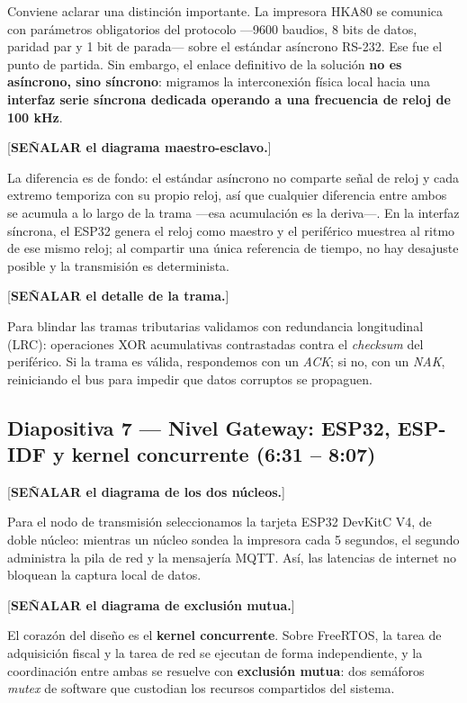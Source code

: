 \documentclass[11pt, a4paper]{article}
\begin{document}
Conviene aclarar una distinción importante. La impresora HKA80 se comunica con parámetros obligatorios del protocolo —9600 baudios, 8 bits de datos, paridad par y 1 bit de parada— sobre el estándar asíncrono RS-232. Ese fue el punto de partida. Sin embargo, el enlace definitivo de la solución \textbf{no es asíncrono, sino síncrono}: migramos la interconexión física local hacia una \textbf{interfaz serie síncrona dedicada operando a una frecuencia de reloj de 100 kHz}.

[\textbf{SEÑALAR el diagrama maestro-esclavo.}]

La diferencia es de fondo: el estándar asíncrono no comparte señal de reloj y cada extremo temporiza con su propio reloj, así que cualquier diferencia entre ambos se acumula a lo largo de la trama —esa acumulación es la deriva—. En la interfaz síncrona, el ESP32 genera el reloj como maestro y el periférico muestrea al ritmo de ese mismo reloj; al compartir una única referencia de tiempo, no hay desajuste posible y la transmisión es determinista.

[\textbf{SEÑALAR el detalle de la trama.}]

Para blindar las tramas tributarias validamos con redundancia longitudinal (LRC): operaciones XOR acumulativas contrastadas contra el \textit{checksum} del periférico. Si la trama es válida, respondemos con un \textit{ACK}; si no, con un \textit{NAK}, reiniciando el bus para impedir que datos corruptos se propaguen.

\subsection*{Diapositiva 7 — Nivel Gateway: ESP32, ESP-IDF y kernel concurrente (6:31 – 8:07)}

[\textbf{SEÑALAR el diagrama de los dos núcleos.}]

Para el nodo de transmisión seleccionamos la tarjeta ESP32 DevKitC V4, de doble núcleo: mientras un núcleo sondea la impresora cada 5 segundos, el segundo administra la pila de red y la mensajería MQTT. Así, las latencias de internet no bloquean la captura local de datos.

[\textbf{SEÑALAR el diagrama de exclusión mutua.}]

El corazón del diseño es el \textbf{kernel concurrente}. Sobre FreeRTOS, la tarea de adquisición fiscal y la tarea de red se ejecutan de forma independiente, y la coordinación entre ambas se resuelve con \textbf{exclusión mutua}: dos semáforos \textit{mutex} de software que custodian los recursos compartidos del sistema.
\end{document}
